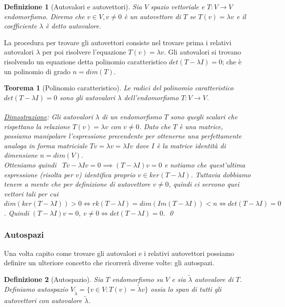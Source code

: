 \documentclass[a4paper,12pt]{report}
\newtheorem{teorema}{Teorema}[chapter]
\newtheorem{definizione}{Definizione}[chapter]
\begin{document}
\begin{definizione}[Autovalori e autovettori]
    Sia $V$ spazio vettoriale e $T:V \to V$ endomorfismo. Diremo che $v \in V, v \neq0$ è un autovettore di $T$ se $T(v)=\lambda v$ e il coefficiente $\lambda $ è detto autovalore.
\end{definizione}

La procedura per trovare gli autovettori consiste nel trovare prima i relativi autovalori $\lambda$ per poi risolvere l'equazione $T(v)=\lambda v$. Gli autovalori si trovano risolvendo un equazione detta polinomio caratteristico $det(T-\lambda I)=0$; che è un polinomio di grado $n=dim(T)$.

\begin{teorema}[Polinomio caratteristico]
    
    Le radici del polinomio caratteristico \\ $det(T-\lambda I)=0$ sono gli autovalori $\lambda$ dell'endomorfismo $T:V \to V$.
    \\
    \\ \underline{Dimostrazione}: Gli autovalori $\lambda$ di un endomorfismo $T$ sono quegli scalari che rispettano la relazione $T(v)=\lambda v$ con $v \neq0$. Dato che $T$ è una matrice, possiamo manipolare l'espressione precendente per ottenerne una perfettamente analoga in forma matriciale $Tv=\lambda v=\lambda Iv$ dove $I$ è la matrice identità di dimensione $n=dim(V)$. 
    \\ Otteniamo quindi \ $Tv-\lambda Iv=0 \implies (T-\lambda I)v=0$ e notiamo che quest'ultima espressione (risolta per $v$) identifica proprio $v \in ker(T-\lambda I)$. Tuttavia dobbiamo tenere a mente che per definizione di autovettore $v \neq 0$, quindi ci servono quei vettori tali per cui $dim(ker(T-\lambda I)) >0 \iff rk(T-\lambda I)=dim(Im(T-\lambda I)) < n \iff det(T-\lambda I)=0$. Quindi $(T-\lambda I)v=0, \ v \neq 0 \iff det(T-\lambda I)=0$. \qed

\end{teorema}  

\subsubsection{Autospazi}

Una volta capito come trovare gli autovalori e i relativi autovettori possiamo definire un ulteriore concetto che ricorrerà diverse volte: gli autospazi.

\begin{definizione}[Autospazio] \label{def:1.18}
    Sia $T$ endomorfismo su $V$ e sia $\widetilde\lambda$ autovalore di $T$. Definiamo autospazio $V_{\widetilde\lambda}=\{v \in V: T(v)=\widetilde\lambda v\}$ ossia lo span di tutti gli autovettori con autovalore $\widetilde\lambda$.
\end{definizione}
\end{document}
